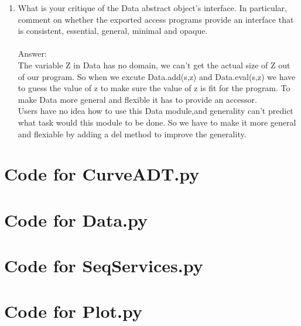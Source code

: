 \documentclass[12pt]{article}
\begin{document}
\begin{enumerate}
\item What is your critique of the Data abstract object's interface.  In
  particular, comment on whether the exported access programs provide an
  interface that is consistent, essential, general, minimal and opaque.\\
 \\
Answer:\\
The variable Z in Data has no domain, we can't get the actual size of Z out of our program. So when we excute Data.add(s,z) and Data.eval(s,z) we have to guess the value of z to make sure the value of z is fit for the program. To make Data more general and flexible it has to provide an accessor. \\
Users have no idea how to use this Data module,and generality can't predict what task would this module to be done. So we have to make it more general and flexiable by adding a del method to improve the generality. 
\end{enumerate}

\newpage

\lstset{language=Python, basicstyle=\tiny, breaklines=true, showspaces=false,
  showstringspaces=false, breakatwhitespace=true}

\def\thesection{\Alph{section}}

\section{Code for CurveADT.py}

\noindent 

\newpage

\section{Code for Data.py}

\noindent 

\newpage

\section{Code for SeqServices.py}

\noindent 

\newpage

\section{Code for Plot.py}
\end{document}
